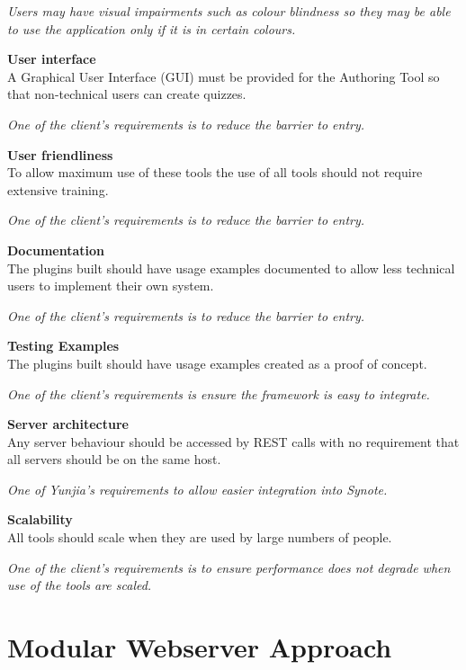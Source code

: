 \begin{requirement}[label=\textbf{N\arabic*}]
\textit{Users may have visual impairments such as colour blindness so they may be able to use the application only if it is in certain colours.}
\item \textbf{User interface} \label{Req:User interface} \hfill \\ A Graphical User Interface (GUI) must be provided for the Authoring Tool so that non-technical users can create quizzes.

\textit{One of the client's requirements is to reduce the barrier to entry.}
\item \textbf{User friendliness} \label{Req:User friendliness} \hfill \\ To allow maximum use of these tools the use of all tools should not require extensive training.

\textit{One of the client's requirements is to reduce the barrier to entry.}
\item \textbf{Documentation} \label{Req:Documentation} \hfill \\ The plugins built should have usage examples documented to allow less technical users to implement their own system.

\textit{One of the client's requirements is to reduce the barrier to entry.}
\item \textbf{Testing Examples} \label{Req:Testing Examples} \hfill \\ The plugins built should have usage examples created as a proof of concept.

\textit{One of the client's requirements is ensure the framework is easy to integrate.}
\item \textbf{Server architecture} \label{Req:Server architecture} \hfill \\ Any server behaviour should be accessed by \gls{REST} calls with no requirement that all servers should be on the same host.

\textit{One of Yunjia's requirements to allow easier integration into Synote.}
\item \textbf{Scalability} \label{Req:Scalability} \hfill \\ All tools should scale when they are used by large numbers of people.

\textit{One of the client's requirements is to ensure performance does not degrade when use of the tools are scaled.}
\end{requirement}

\section{Modular Webserver Approach}
\label{Section:Modular Approach}

